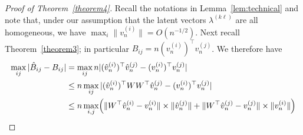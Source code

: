 \documentclass[12pt]{article}
\begin{document}
%

\begin{proof}[Proof of Theorem~\ref{theorem4}]
  Recall the notations in Lemma~\ref{lem:technical} and note that,
  under our assumption that the latent vectors $\lambda^{(k \ell)}$
  are all homogeneous, we have $\max_{i} \|v_n^{(i)}\| =
  O(n^{-1/2})$. 
Next recall Theorem~\ref{theorem3}; in particular $B_{ij} = n(v_n^{(i)})^{\top}
v_n^{(j)}$. %
We therefore have
\[\begin{split}
 \max_{ij} |\hat{B}_{ij} - B_{ij}| &= \max_{ij} n |(\hat{v}_n^{(i)})^\top \hat{v}_n^{(j)} -
(v_n^{(i)})^\top v_n^{(j)}| \\
& \leq n \max_{ij} |(\hat{v}_n^{(i)})^\top W W^\top \hat{v}_n^{(j)} -
(v_n^{(i)})^\top v_n^{(j)}| \\
& \leq n \max_{i,j} \Bigl(\|W^{\top} \hat{v}_n^{(i)} - v_n^{(i)}\| \times \|\hat{v}_n^{(j)}\|
+ \|W^{\top} \hat{v}_n^{(j)} - v_n^{(j)}\| \times \|v_n^{(i)}\|\Bigr) \\

\end{split}\]
\end{proof}
\end{document}
